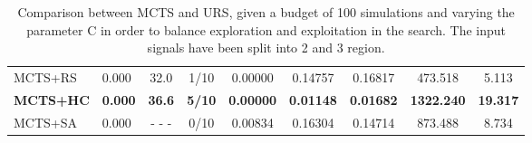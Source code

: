 \documentclass[11pt]{article}
\begin{document}
\begin{table}[ht]
\begin{tabular}{|l|l|c|c|c|c|c|c|c|}
MCTS+RS                                     & 0.000              &  32.0                   & 1/10                          & 0.00000  & 0.14757  & 0.16817  &  473.518   &  5.113       \\
\textbf{MCTS+HC}                                     & \textbf{0.000}              &  \textbf{36.6}                   & \textbf{5/10}                          & \textbf{0.00000}  & \textbf{0.01148}  & \textbf{0.01682}  & \textbf{1322.240}   & \textbf{19.317}       \\
MCTS+SA                                     & 0.000              & - - -                   & 0/10                          & 0.00834  & 0.16304  & 0.14714  &  873.488   &  8.734       \\ \hline
\end{tabular}
\caption{Comparison between MCTS and URS, given a budget of 100 simulations and varying the parameter C in order to balance exploration and exploitation in the search. The input signals have been split into 2 and 3 region.}~\label{table:res:s2}
\end{table}
\end{document}
